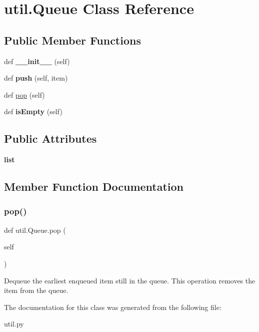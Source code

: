 \hypertarget{classutil_1_1_queue}{}\section{util.\+Queue Class Reference}
\label{classutil_1_1_queue}
\subsection*{Public Member Functions}
\begin{DoxyCompactItemize}
\item 
\mbox{\label{classutil_1_1_queue_a65b116b07123e34eef3f210504565f78}} 
def {\bfseries \+\_\+\+\_\+init\+\_\+\+\_\+} (self)
\item 
\mbox{\label{classutil_1_1_queue_acf2bffae0b1b8b663a7489ba4fd51d3a}} 
def {\bfseries push} (self, item)
\item 
def \hyperlink{classutil_1_1_queue_acb244571d931f24864b4a2e889130396}{pop} (self)
\item 
\mbox{\label{classutil_1_1_queue_aacf6d8d4ee520c2f5209e4740f6419af}} 
def {\bfseries is\+Empty} (self)
\end{DoxyCompactItemize}
\subsection*{Public Attributes}
\begin{DoxyCompactItemize}
\item 
\mbox{\label{classutil_1_1_queue_ac25f813a4fc57ebd0e687ab845df3bbd}} 
{\bfseries list}
\end{DoxyCompactItemize}


\subsection{Member Function Documentation}
\mbox{\label{classutil_1_1_queue_acb244571d931f24864b4a2e889130396}} 
\subsubsection{\texorpdfstring{pop()}{pop()}}
{\footnotesize\ttfamily def util.\+Queue.\+pop (\begin{DoxyParamCaption}\item[{}]{self }\end{DoxyParamCaption})}

\begin{DoxyVerb}  Dequeue the earliest enqueued item still in the queue. This
  operation removes the item from the queue.
\end{DoxyVerb}
 

The documentation for this class was generated from the following file\+:\begin{DoxyCompactItemize}
\item 
util.\+py\end{DoxyCompactItemize}
